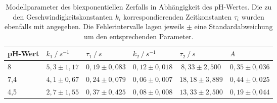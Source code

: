 \begin{table}[h]
	\centering
	\caption[Modellparameter des biexponentiellen Zerfalls]{Modellparameter des biexponentiellen Zerfalls in Abhängigkeit des pH-Wertes. Die zu den Geschwindigkeitskonstanten $k_i$ korrespondierenden Zeitkonstanten $\tau_i$ wurden ebenfalls mit angegeben. Die Fehlerintervalle lagen jeweils $\pm$ eine Standardabweichung um den entsprechenden Parameter.}
	\label{tab:parameter_biexponentieller_zerfall}
	\begin{threeparttable}
		\keepXColumns
		\begin{tabularx}{\textwidth}{p{2cm} X X X X X}
			\textbf{pH-Wert}	&	\textbf{$k_1~/~s^{-1}$}	&	\textbf{$\tau_1~/~s$}	&	\textbf{$k_2~/~s^{-1}$}	&	\textbf{$\tau_2~/~s$}	&	\textbf{$A$}\\
			\toprule
			\toprule
			8	& $5,3 \pm 1,17$	&	$0,19 \pm 0,083$	&	$0,12 \pm 0,018$	&	$~8,33 \pm 2,500$	&	$0,35 \pm 0,036$	\\
			7,4	&	$4,1 \pm 0,67$	&	$0,24 \pm 0,079$	&	$0,06 \pm 0,007$	&	$18,18 \pm 3,889$	&	$0,44 \pm 0,025$	\\
			4,5	&	$2,7 \pm 1,55$	&	$0,37 \pm 0,425$	&	$0,08 \pm 0,008$	&	$13,33 \pm 2,500$	&	$0,19 \pm 0,044$	\\	
			\toprule
			\toprule
		\end{tabularx}
	\end{threeparttable}
\end{table}

